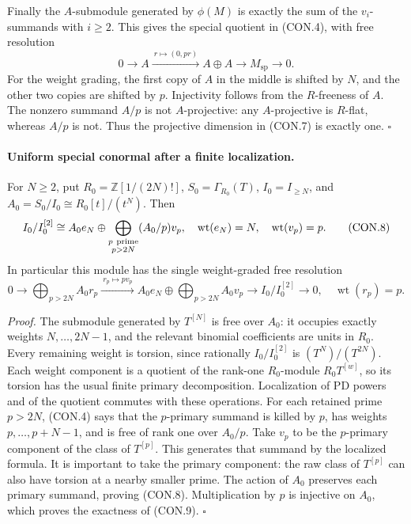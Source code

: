Finally the \(A\)-submodule generated by \(\phi(M)\) is exactly the
sum of the \(v_i\)-summands with \(i\ge2\).
This gives the special quotient in (CON.4), with free resolution
\[
 0\longrightarrow A
   \xrightarrow{\ r\mapsto(0,pr)\ }
   A\oplus A\longrightarrow M_{\mathrm{sp}}\longrightarrow0.
 \tag{CON.7}
\]
For the weight grading, the first copy of \(A\) in the middle is
shifted by \(N\), and the other two copies are shifted by \(p\).
Injectivity follows from the \(R\)-freeness of \(A\).
The nonzero summand \(A/p\) is not \(A\)-projective: any
\(A\)-projective is \(R\)-flat, whereas \(A/p\) is not.
Thus the projective dimension in (CON.7) is exactly one.
\(\square\)

\paragraph{Uniform special conormal after a finite localization.}
For \(N\ge2\), put \(R_0=\mathbb Z[1/(2N)!]\),
\(S_0=\Gamma_{R_0}(T)\), \(I_0=I_{\ge N}\), and
\(A_0=S_0/I_0\cong R_0[t]/(t^N)\). Then
\[
 I_0/I_0^{[2]}
 \cong A_0e_N\oplus
       \bigoplus_{\substack{p\ {\rm prime}\\p>2N}}(A_0/p)v_p,
 \quad \operatorname{wt}(e_N)=N,\quad\operatorname{wt}(v_p)=p.
 \tag{CON.8}
\]
In particular this module has the single weight-graded free resolution
\[
 0\longrightarrow
 \bigoplus_{p>2N}A_0r_p
 \xrightarrow{\ r_p\mapsto p v_p\ }
 A_0e_N\oplus\bigoplus_{p>2N}A_0v_p
 \longrightarrow I_0/I_0^{[2]}\longrightarrow0,
 \quad \operatorname{wt}(r_p)=p.
 \tag{CON.9}
\]

\emph{Proof.}
The submodule generated by \(T^{[N]}\) is free over \(A_0\):
it occupies exactly weights \(N,\ldots,2N-1\), and the relevant
binomial coefficients are units in \(R_0\).
Every remaining weight is torsion, since rationally
\(I_0/I_0^{[2]}\) is \((T^N)/(T^{2N})\).
Each weight component is a quotient of the rank-one \(R_0\)-module
\(R_0T^{[w]}\), so its torsion has the usual finite primary
decomposition. Localization of PD powers and of the quotient commutes
with these operations. For each retained prime \(p>2N\), (CON.4)
says that the \(p\)-primary summand is killed by \(p\), has weights
\(p,\ldots,p+N-1\), and is free of rank one over \(A_0/p\).
Take \(v_p\) to be the \(p\)-primary component of the class of
\(T^{[p]}\). This generates that summand by the localized formula.
It is important to take the primary component: the raw class of
\(T^{[p]}\) can also have torsion at a nearby smaller prime.
The action of \(A_0\) preserves each primary summand, proving (CON.8).
Multiplication by \(p\) is injective on \(A_0\), which proves the
exactness of (CON.9). \(\square\)


